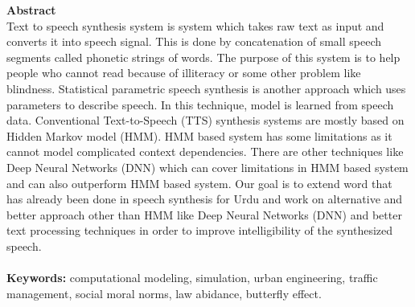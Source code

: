 
{\LARGE\textbf {Abstract}} \\ %
Text to speech synthesis system is system which takes raw text as input and converts it into speech signal.
This is done by concatenation of small speech segments called phonetic strings of words. The purpose of
this system is to help people who cannot read because of illiteracy or some other problem like blindness.
Statistical parametric speech synthesis is another approach which uses parameters to describe speech. In
this technique, model is learned from speech data. Conventional Text-to-Speech (TTS) synthesis systems
are mostly based on Hidden Markov model (HMM). HMM based system has some limitations as it cannot
model complicated context dependencies. There are other techniques like Deep Neural Networks (DNN)
which can cover limitations in HMM based system and can also outperform HMM based system.
Our goal is to extend word that has already been done in speech synthesis for Urdu and work on
alternative and better approach other than HMM like Deep Neural Networks (DNN) and better text
processing techniques in order to improve intelligibility of the synthesized speech. \\ \\
\textbf{Keywords:}
computational modeling, simulation, urban engineering, traffic management, social moral norms, law abidance, butterfly effect.


